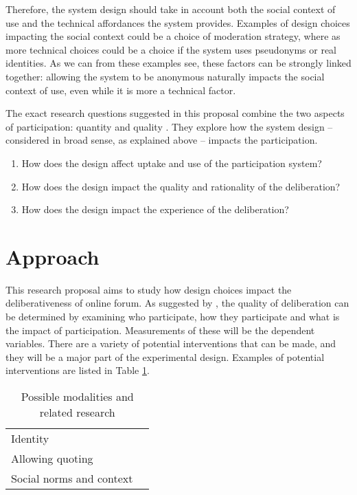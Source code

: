 \documentclass[journal,a4paper]{IEEEtran}
\begin{document}
Therefore, the system design should take in account both the social context of use and the technical affordances the system provides. Examples of design choices impacting the social context could be a choice of moderation strategy, where as more technical choices could be a choice if the system uses pseudonyms or real identities. As we can from these examples see, these factors can be strongly linked together: allowing the system to be anonymous naturally impacts the social context of use, even while it is more a technical factor.

The exact research questions suggested in this proposal combine the two aspects of participation: quantity and quality . They explore how the system design -- considered in broad sense, as explained above -- impacts the participation.

\begin{enumerate}
\item How does the design affect uptake and use of the participation system?
\item How does the design impact the quality and rationality of the deliberation?
\item How does the design impact the experience of the deliberation?
\end{enumerate}

\section{Approach}
This research proposal aims to study how design choices impact the deliberativeness of online forum. As suggested by , the quality of deliberation can be determined by examining who participate, how they participate and what is the impact of participation. Measurements of these will be the dependent variables. There are a variety of potential interventions that can be made, and they will be a major part of the experimental design. Examples of potential interventions are listed in Table \ref{tab:modalities}.

\begin{table}
\caption{Possible modalities and related research}
\begin{tabular}{ll}
Identity & \cite{danet98,donath99}  \\ 
Allowing quoting & \cite{eklundh94} \\ 
Social norms and context & \cite{sukumaran11,underhill03} \\
\end{tabular} 
\label{tab:modalities}
\end{table}
\end{document}
